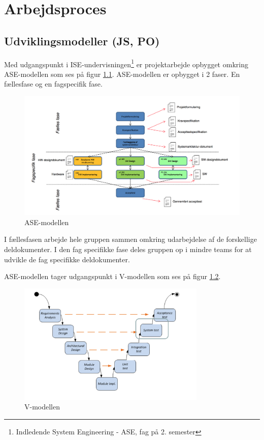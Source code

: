 \chapter{Arbejdsproces}

\section{Udviklingsmodeller (JS, PO)}
Med udgangspunkt i ISE-undervisningen\footnote{Indledende System Engineering - ASE, fag på 2. semester} er projektarbejde opbygget omkring ASE-modellen som ses på figur \ref{fig:ASE_model}. ASE-modellen er opbygget i 2 faser. En fællesfase og en fagspecifik fase. 


\begin{figure}[htbp]
  \centering
    \includegraphics[width=\textwidth]{billeder/ASE-modellen}
    \caption{ASE-modellen}
    \label{fig:ASE_model}
\end{figure}

I fællesfasen arbejde hele gruppen sammen omkring udarbejdelse af de forskellige deldokumenter. 
I den fag specifikke fase deles gruppen op i mindre teams for at udvikle de fag specifikke deldokumenter. 

ASE-modellen tager udgangspunkt i V-modellen som ses på figur \ref{fig:V_model}.   

\begin{figure}[htbp]
  \centering
    \includegraphics[width=0.8\textwidth]{billeder/V-modellen}
    \caption{V-modellen}
    \label{fig:V_model}
\end{figure}

